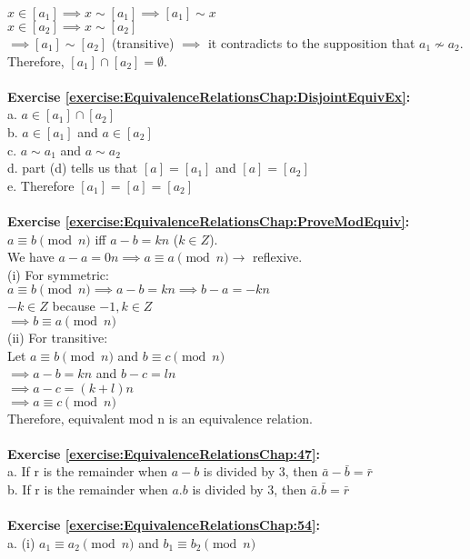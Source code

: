 $x\in[a_1] \implies x\sim [a_1] \implies [a_1]\sim x$\\
$x\in[a_2] \implies x\sim [a_2]$\\
$\implies [a_1]\sim[a_2]$ (transitive) $\implies$  it contradicts to the supposition that $a_1 \not\sim a_2$.\\
Therefore, $[a_1]\cap[a_2]=\emptyset$.\\
\\
\textbf{Exercise \ref{exercise:EquivalenceRelationsChap:DisjointEquivEx}:}\\
a. $a\in[a_1]\cap[a_2]$\\
b. $a\in[a_1]$ and $a\in[a_2]$\\
c. $a\sim a_1$ and $a\sim a_2$\\
d. part (d) tells us that $[a]=[a_1]$ and $[a]=[a_2]$\\
e. Therefore $[a_1]=[a]=[a_2]$\\
\\
\textbf{Exercise \ref{exercise:EquivalenceRelationsChap:ProveModEquiv}:}\\
$a\equiv b\pmod{n}$ iff $a-b=kn$ ($k\in Z$).\\
We have $a-a=0n \implies a\equiv a\pmod{n} \to$ reflexive.\\
(i) For symmetric:\\
$a\equiv b\pmod{n} \implies a-b=kn \implies b-a=-kn$\\
$-k\in Z$ because $-1,k\in Z$\\
$\implies b\equiv a\pmod{n}$\\
(ii) For transitive:\\
Let $a\equiv b\pmod{n}$ and $b\equiv c\pmod{n}$\\
$\implies a-b=kn$ and $b-c=ln$\\
$\implies a-c=(k+l)n$\\
$\implies a\equiv c\pmod{n}$\\
Therefore, equivalent mod n is an equivalence relation.\\
\\
\textbf{Exercise \ref{exercise:EquivalenceRelationsChap:47}:}\\
a. If r is the remainder when $a-b$ is divided by 3, then $\bar{a}-\bar{b}=\bar{r}$\\
b. If r is the remainder when $a.b$ is divided by 3, then $\bar{a}.\bar{b}=\bar{r}$\\
\\
\textbf{Exercise \ref{exercise:EquivalenceRelationsChap:54}:}\\
a. (i) $a_1\equiv a_2\pmod{n}$ and $b_1\equiv b_2\pmod{n}$\\
